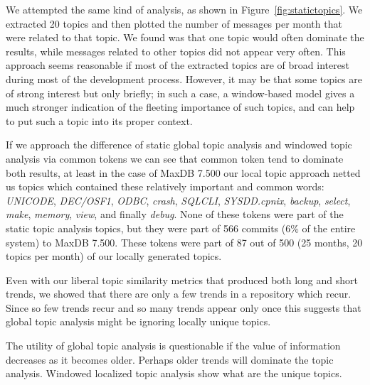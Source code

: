 \documentclass[times, 10pt,twocolumn]{article}
\begin{document}
We attempted the same kind of analysis, as shown in
Figure~\ref{fig:statictopics}. We extracted 20 topics and then plotted
the number of messages per month that were related to that topic. We
found was that one topic would often dominate the results, while
messages related to other topics did not appear very often.
This approach seems reasonable if most of the extracted topics are of
broad interest during most of the development process.  However, it
may be that some topics are of strong interest but only briefly; in
such a case, a window-based model gives a much stronger indication of
the fleeting importance of such topics, and can help to put such a
topic into its proper context.


If we approach the difference of static global topic analysis and
windowed topic analysis via common tokens we can see that common token
tend to dominate both results, at least in the case of MaxDB 7.500 our
local topic approach netted us topics which contained these relatively
important and common words: \emph{UNICODE}, \emph{DEC/OSF1},
\emph{ODBC}, \emph{crash}, \emph{SQLCLI}, \emph{SYSDD.cpnix},
\emph{backup}, \emph{select}, \emph{make}, \emph{memory}, \emph{view},
and finally \emph{debug}. None of these tokens were part of the static
topic analysis topics, but they were part of 566 commits (6\% of the
entire system) to MaxDB 7.500. These tokens were part of 87 out of 500
(25 months, 20 topics per month) of our locally generated topics.


Even with our liberal topic similarity metrics that produced both
long and short trends, we showed that there are only a few trends in a
repository which recur. Since so few trends recur and so many
trends appear only once this suggests that global topic analysis might
be ignoring locally unique topics. 

The utility of global topic analysis is questionable if the value of
information decreases as it becomes older. Perhaps older trends will
dominate the topic analysis. Windowed localized topic analysis show
what are the unique topics.
\end{document}
